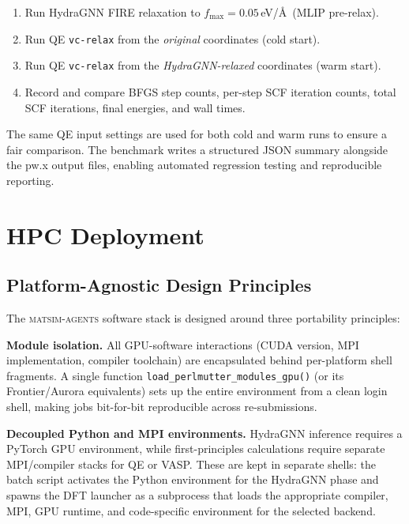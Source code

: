 \documentclass[conference]{IEEEtran}
\def\ac#1{#1}%
\def\acs#1{#1}%
\begin{document}
\begin{enumerate}
\item Run HydraGNN \acs{FIRE} relaxation to $f_\text{max} = 0.05$\,eV/\AA\ (\acs{MLIP}
  pre-relax).
\item Run \acs{QE} \texttt{vc-relax} from the \emph{original} coordinates (cold
  start).
\item Run \acs{QE} \texttt{vc-relax} from the \emph{HydraGNN-relaxed} coordinates
  (warm start).
\item Record and compare \acs{BFGS} step counts, per-step \acs{SCF} iteration counts,
  total \acs{SCF} iterations, final energies, and wall times.
\end{enumerate}

The same \acs{QE} input settings are used for both cold and warm runs to ensure a
fair comparison. The benchmark writes a structured \ac{JSON} summary alongside the
pw.x output files, enabling automated regression testing and reproducible
reporting.

\section{HPC Deployment}
\label{sec:hpc}

\subsection{Platform-Agnostic Design Principles}
The \textsc{matsim-agents} software stack is designed around three portability
principles:

\textbf{Module isolation.} All \acs{GPU}-software interactions (\acs{CUDA} version, \acs{MPI}
implementation, compiler toolchain) are encapsulated behind per-platform shell
fragments. A single function \texttt{load\_perlmutter\_modules\_gpu()} (or its
Frontier/Aurora equivalents) sets up the entire environment from a clean login
shell, making jobs bit-for-bit reproducible across re-submissions.

\textbf{Decoupled Python and \ac{MPI} environments.} HydraGNN inference requires a
PyTorch \acs{GPU} environment, while first-principles calculations require separate
\acs{MPI}/compiler stacks for \acs{QE} or \acs{VASP}. These are kept in separate shells: the batch
script activates the Python environment for the HydraGNN phase and spawns the
\acs{DFT} launcher as a subprocess that loads the appropriate compiler, \acs{MPI}, \acs{GPU}
runtime, and code-specific environment for the selected backend.
\end{document}
